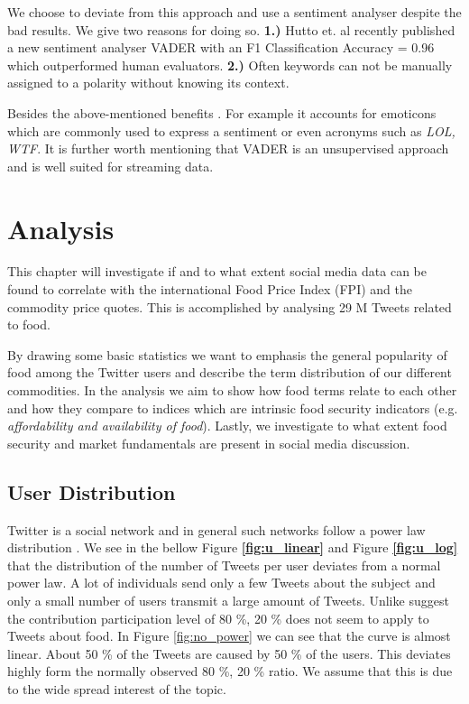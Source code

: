 We choose to deviate from this approach and use a sentiment analyser despite the bad results. We give two reasons for doing so. \textbf{1.)} Hutto et. al recently published a new sentiment analyser VADER \cite{hutton14} with an F1 Classification Accuracy = 0.96 which outperformed human evaluators. \textbf{2.)} Often keywords can not be manually assigned to a polarity without knowing its context. 

Besides the above-mentioned benefits  \cite{hutton14}. For example it accounts for emoticons which are commonly used to express a sentiment or even acronyms such as \emph{LOL, WTF}. It is further worth mentioning that VADER is an unsupervised approach and is well suited for streaming data. 






\chapter{Analysis}
\label{4}

This chapter will investigate if and to what extent social media data can be found to correlate with the international Food Price Index (FPI) and the commodity price quotes. This is accomplished by analysing 29 M Tweets related to food. 

By drawing some basic statistics we want to emphasis the general popularity of food among the Twitter users and describe the term distribution of our different commodities. In the analysis we aim to show how food terms relate to each other and how they compare to indices which are intrinsic food security indicators (e.g. \emph {affordability and availability of food}). Lastly, we investigate to what extent food security and market fundamentals are present in social media discussion. 


\section {User Distribution}

Twitter is a social network and in general such networks follow a power law distribution \cite{Whittaker:1998}. We see in the bellow Figure \textbf{\ref{fig:u_linear}} and Figure \textbf{\ref{fig:u_log}}  that the distribution of the number of Tweets per user deviates from a normal power law. A lot of individuals  send only a few Tweets about the subject and only a small number of users transmit a large amount of Tweets. Unlike \cite{bild15} suggest the contribution participation level of  80 \%, 20 \%   does not seem to apply to Tweets about food. In Figure \ref{fig:no_power} we can see that the curve is almost linear. About 50 \% of the Tweets are caused by 50 \% of the users. This deviates highly form the normally observed 80 \%, 20 \% ratio. We assume that this is due to the wide spread interest of the topic.




